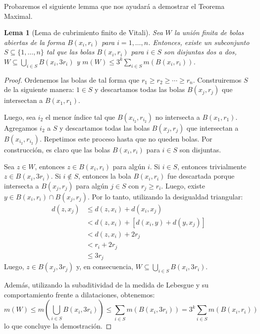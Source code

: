\documentclass[12pt,a4paper]{article}
\theoremstyle{profesional}
\newtheorem{lemma}{Lema}[section]
\theoremstyle{definicion-style}
\begin{document}
\clearpage

Probaremos el siguiente lemma que nos ayudará a demostrar el Teorema Maximal.
\begin{lemma}[Lema de cubrimiento finito de Vitali]
    Sea \( W \) la unión finita de bolas abiertas de la forma \( B(x_i, r_i) \) para \( i = 1, \dots, n \). Entonces, existe un subconjunto \( S \subseteq \{ 1, \dots, n \} \) tal que las bolas \( B(x_i, r_i) \) para \( i \in S \) son disjuntas dos a dos, \( W \subseteq \bigcup_{i \in S} B(x_i, 3r_i) \) y \( m(W) \leq 3^k \sum_{i \in S} m(B(x_i, r_i)) \).
\end{lemma}

\begin{proof}
    Ordenemos las bolas de tal forma que \( r_1 \geq r_2 \geq \cdots \geq r_n \). Construiremos \( S \) de la siguiente manera: \( 1 \in S \) y descartamos todas las bolas \( B(x_j, r_j) \) que intersectan a \( B(x_1, r_1) \).

    Luego, sea \( i_2 \) el menor índice tal que \( B(x_{i_2}, r_{i_2}) \) no intersecta a \( B(x_1, r_1) \). Agregamos \( i_2 \) a \( S \) y descartamos todas las bolas \( B(x_j, r_j) \) que intersectan a \( B(x_{i_2}, r_{i_2}) \). Repetimos este proceso hasta que no queden bolas. Por construcción, es claro que las bolas \( B(x_i, r_i) \) para \( i \in S \) son disjuntas.

    Sea \( z \in W \), entonces \( z \in B(x_i, r_i) \) para algún \( i \). Si \( i \in S \), entonces trivialmente \( z \in B(x_i, 3r_i) \). Si \( i \notin S \), entonces la bola \( B(x_i, r_i) \) fue descartada porque intersecta a \( B(x_j, r_j) \) para algún \( j \in S \) con \( r_j \geq r_i \). Luego, existe \( y \in B(x_i, r_i) \cap B(x_j, r_j) \). Por lo tanto, utilizando la desigualdad triangular:
    \begin{align*}
        d(z, x_j) & \leq d(z, x_i) + d(x_i, x_j)          \\
                  & < d(z, x_i) + [d(x_i, y) + d(y, x_j)] \\
                  & < d(z, x_i) + 2r_j                    \\
                  & < r_i + 2r_j                          \\
                  & \leq 3r_j
    \end{align*}
    Luego, \( z \in B(x_j, 3r_j) \) y, en consecuencia, \( W \subseteq \bigcup_{i \in S} B(x_i, 3r_i) \).

    Además, utilizando la subaditividad de la medida de Lebesgue y su comportamiento frente a dilataciones, obtenemos:
    \[
        m(W) \leq m\left( \bigcup_{i \in S} B(x_i, 3r_i) \right) \leq \sum_{i \in S} m(B(x_i, 3r_i)) = 3^k \sum_{i \in S} m(B(x_i, r_i))
    \]
    lo que concluye la demostración.
\end{proof}
\end{document}
